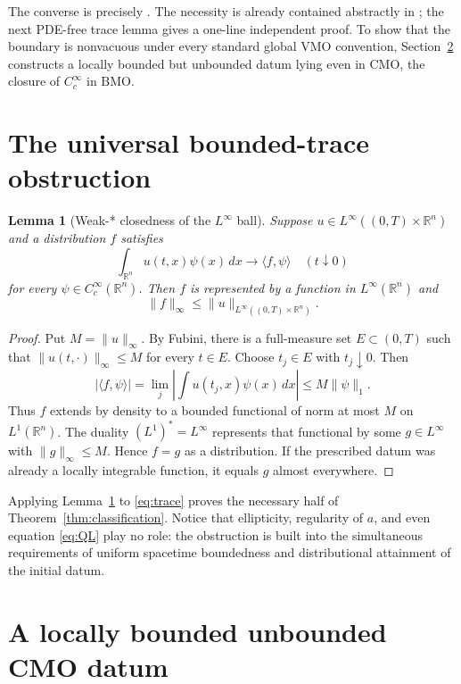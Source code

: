 \documentclass[11pt]{article}
\newtheorem{lemma}[theorem]{Lemma}
\newcommand{\R}{\mathbb R}
\newcommand{\BMO}{\mathrm{BMO}}
\newcommand{\CMO}{\mathrm{CMO}}
\begin{document}
The converse is precisely \cite[Corollary 1.5]{AB}.  The necessity is
already contained abstractly in \cite[Proposition 3.4(b)]{AB}; the next
PDE-free trace lemma gives a one-line independent proof.  To show that the
boundary is nonvacuous under every
standard global VMO convention, Section~\ref{sec:example} constructs a
locally bounded but unbounded datum lying even in $\CMO$, the closure of
$C_c^\infty$ in $\BMO$.

\section{The universal bounded-trace obstruction}

\begin{lemma}[Weak-* closedness of the $L^\infty$ ball]\label{lem:trace}
Suppose $u\in L^\infty((0,T)\times\R^n)$ and a distribution $f$ satisfies
\[
 \int_{\R^n}u(t,x)\psi(x)\,dx\longrightarrow\langle f,\psi\rangle
 \quad(t\downarrow0)
\]
for every $\psi\in C_c^\infty(\R^n)$.  Then $f$ is represented by a
function in $L^\infty(\R^n)$ and
\[
 \|f\|_\infty\leq\|u\|_{L^\infty((0,T)\times\R^n)}.
\]
\end{lemma}

\begin{proof}
Put $M=\|u\|_\infty$.  By Fubini, there is a full-measure set
$E\subset(0,T)$ such that $\|u(t,\cdot)\|_\infty\leq M$ for every
$t\in E$.  Choose $t_j\in E$ with $t_j\downarrow0$.  Then
\[
 |\langle f,\psi\rangle|
   =\lim_j\left|\int u(t_j,x)\psi(x)\,dx\right|
   \leq M\|\psi\|_1.
\]
Thus $f$ extends by density to a bounded functional of norm at most $M$ on
$L^1(\R^n)$.  The duality $(L^1)^*=L^\infty$ represents that functional by
some $g\in L^\infty$ with $\|g\|_\infty\leq M$.  Hence $f=g$ as a
distribution.  If the prescribed datum was already a locally integrable
function, it equals $g$ almost everywhere.
\end{proof}

Applying Lemma~\ref{lem:trace} to \eqref{eq:trace} proves the necessary
half of Theorem~\ref{thm:classification}.  Notice that ellipticity,
regularity of $a$, and even equation \eqref{eq:QL} play no role: the
obstruction is built into the simultaneous requirements of uniform
spacetime boundedness and distributional attainment of the initial datum.

\section{A locally bounded unbounded CMO datum}\label{sec:example}
\end{document}
